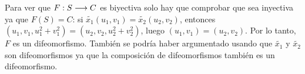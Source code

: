 \documentclass[12pt]{article}
\begin{document}
Para ver que $F : S \longrightarrow C$ es biyectiva solo hay que comprobar que sea inyectiva ya que $F(S)=C$: si $\widetilde{x_1}(u_1,v_1)=\widetilde{x_2}(u_2,v_2)$, entonces $(u_1,v_1,u_1^2+v_1^2)=(u_2,v_2,u_2^2+v_2^2)$, luego $(u_1,v_1)=(u_2,v_2)$. Por lo tanto, $F$ es un difeomorfismo. También se podría haber argumentado usando que $\widetilde{x_1}$ y $\widetilde{x_2}$ son difeomorfismos ya que la composición de difeomorfismos también es un difeomorfismo.
\end{document}
